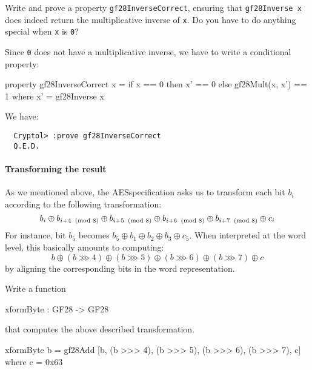 \begin{Exercise}\label{ex:gfmi:1}
  Write and prove a property {\tt gf28InverseCorrect}, ensuring that
  {\tt gf28Inverse x} does indeed return the multiplicative inverse of
  {\tt x}.  Do you have to do anything special when {\tt x} is \texttt{0}?
\end{Exercise}
\begin{Answer}
  Since \texttt{0} does not have a multiplicative inverse, we have to write a
  conditional property:
\begin{code}
  property gf28InverseCorrect x =
      if x == 0 then x' == 0 else gf28Mult(x, x') == 1
    where x' = gf28Inverse x
\end{code}
We have:
\begin{Verbatim}
  Cryptol> :prove gf28InverseCorrect
  Q.E.D.
\end{Verbatim}
\end{Answer}

\paragraph*{Transforming the result} As we mentioned above, the
AES\indAES specification asks us to transform each bit $b_i$ according
to the following transformation:
$$
 b_i \oplus b_{i+4\imod{8}} \oplus b_{i+5\imod{8}} \oplus b_{i+6\imod{8}} \oplus b_{i+7\imod{8}} \oplus c_i
$$
For instance, bit $b_5$ becomes $b_5 \oplus b_1 \oplus b_2 \oplus b_3
\oplus c_5$.  When interpreted at the word level, this basically
amounts to computing:
$$
 b \oplus (b \ggg 4) \oplus (b \ggg 5) \oplus (b \ggg 6) \oplus (b \ggg 7) \oplus c
$$
by aligning the corresponding bits in the word representation.


\begin{Exercise}\label{ex:aessbytes:0}
Write a function
\begin{code}
  xformByte : GF28 -> GF28
\end{code}
that computes the above described transformation.
\end{Exercise}
\begin{Answer}
\begin{code}
  xformByte b = gf28Add [b, (b >>> 4), (b >>> 5),
                         (b >>> 6), (b >>> 7), c]
    where c = 0x63
\end{code}
\end{Answer}


